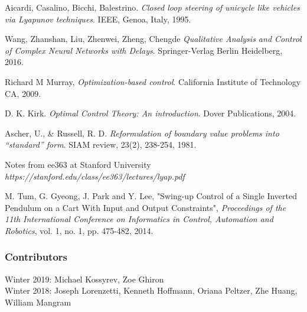 ﻿\documentclass[twoside]{article}
\begin{document}
\begin{thebibliography}{9}
Aicardi, Casalino, Bicchi, Balestrino.
\textit{Closed loop steering of unicycle like vehicles via Lyapunov techniques}.
IEEE, Genoa, Italy, 1995.


Wang, Zhanshan, Liu, Zhenwei, Zheng, Chengde
\textit{Qualitative Analysis and Control of Complex Neural Networks with Delays}.
Springer-Verlag Berlin Heidelberg,  2016.


Richard M Murray, \textit{Optimization-based control}. California Institute of Technology CA, 2009.

D. K. Kirk. \textit{Optimal Control Theory: An introduction}. Dover Publications, 2004.

Ascher, U., \& Russell, R. D. \textit{Reformulation of boundary value problems into ``standard'' form}. SIAM review, 23(2), 238-254, 1981.

Notes from ee363 at Stanford University
\textit{https://stanford.edu/class/ee363/lectures/lyap.pdf}

M. Tum, G. Gyeong, J. Park and Y. Lee, "Swing-up Control of a Single Inverted Pendulum on a Cart With Input and Output Constraints", \textit{Proceedings of the 11th International Conference on Informatics in Control, Automation and Robotics}, vol. 1, no. 1, pp. 475-482, 2014.

\end{thebibliography}

\subsubsection*{Contributors}
Winter 2019: Michael Kossyrev, Zoe Ghiron
\\
Winter 2018: Joseph Lorenzetti, Kenneth Hoffmann, Oriana Peltzer, Zhe Huang, William Mangram
\end{document}
